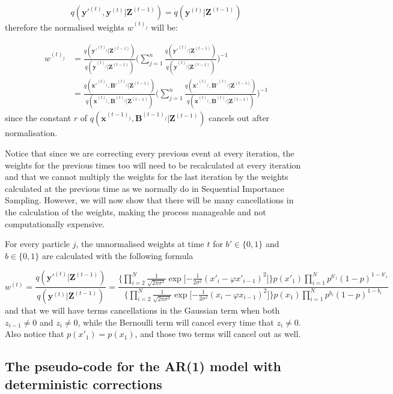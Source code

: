 \documentclass[11pt,a4paper]{article}
\renewcommand{\vec}[1]{\mathbf{#1}}
\begin{document}
{\[
q(\vec{y'}^{(t)}, \vec{y}^{(t)} | \vec{Z}^{(t-1)}) = q(\vec{y}^{(t)} | \vec{Z}^{(t-1)})
\]
therefore the normalised weights $w^{(t)_j}$ will be:

\begin{align*}
w^{(t)_j} & = \frac{q(\vec{y'}^{(t)_j} | \vec{Z}^{(t-1)}) }{q(\vec{y}^{(t)_j} | \vec{Z}^{(t-1)})}\Bigg( \sum_{j=1}^n  \frac{q(\vec{y'}^{(t)_j} | \vec{Z}^{(t-1)}) }{q(\vec{y}^{(t)_j} | \vec{Z}^{(t-1)})}\Bigg)^{-1} \\
& = \frac{q(\vec{x'}^{(t)_j}, \vec{B'}^{(t)_j} | \vec{Z}^{(t-1)}) }{q(\vec{x}^{(t)_j}, \vec{B}^{(t)_j} | \vec{Z}^{(t-1)})}\Bigg( \sum_{j=1}^n \frac{q(\vec{x'}^{(t)_j}, \vec{B'}^{(t)_j} | \vec{Z}^{(t-1)}) }{q(\vec{x}^{(t)_j}, \vec{B}^{(t)_j} | \vec{Z}^{(t-1)})}\Bigg)^{-1}
\end{align*}
since the constant $r$ of $q(\vec{x}^{(t-1)_j},\vec{B}^{(t-1)_j} | \vec{Z}^{(t-1)})$ cancels out after normalisation.

Notice that since we are correcting every previous event at every iteration, the weights for the previous times too will need to be recalculated at every iteration and that we cannot multiply the weights for the last iteration by the weights calculated at the previous time as we normally do in Sequential Importance Sampling. However, we will now show that there will be many cancellations in the calculation of the weights, making the process manageable and not computationally expensive.

For every particle $j$, the unnormalised weights at time $t$ for $b' \in \{0,1\}$ and $b \in \{0,1\}$ are calculated with the following formula

\[
w^{(t)} = \frac{q(\vec{y'}^{(t)} | \vec{Z}^{(t-1)}) }{q(\vec{y}^{(t)} | \vec{Z}^{(t-1)})} = \frac{\bigg \{ \prod_{i=2}^{N}  \frac{1}{\sqrt{2 \pi \sigma^{2}}} \exp \bigg [ { - \frac{1}{2 \sigma^{2}} }  (x'_{i} - \varphi x'_{i-1})^{2} \bigg ] \bigg \} p(x'_{1}) \prod_{i=1}^{N} p^{b'_i} (1 - p)^{1-b'_{i}}  }{\bigg \{ \prod_{i=2}^{N}  \frac{1}{\sqrt{2 \pi \sigma^{2}}} \exp \bigg [ { - \frac{1}{2 \sigma^{2}} }  (x_{i} - \varphi x_{i-1})^{2} \bigg ] \bigg \} p(x_{1}) \prod_{i=1}^{N} p^{b_i} (1 - p)^{1-b_{i}} }
\]
and that we will have terms cancellations in the Gaussian term when both $z_{i-1} \neq 0$ and $z_{i} \neq 0$, while the Bernoulli term will cancel every time that $z_{i} \neq 0$. Also notice that $p(x'_1) = p(x_1)$, and those two terms will cancel out as well.



\subsection{The pseudo-code for the AR(1) model with deterministic corrections}

}
\end{document}
